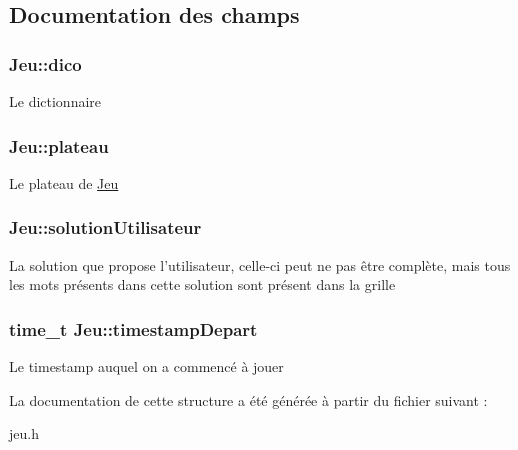 \subsection{Documentation des champs}
\hypertarget{structJeu_a6bda384c6fca4e83ae15ac69f2228a41}{
\subsubsection[{dico}]{ {\bf Jeu::dico}}}
\label{structJeu_a6bda384c6fca4e83ae15ac69f2228a41}
Le dictionnaire \hypertarget{structJeu_af2931c71f6de940ec7ed3fcd2f9d7158}{
\subsubsection[{plateau}]{ {\bf Jeu::plateau}}}
\label{structJeu_af2931c71f6de940ec7ed3fcd2f9d7158}
Le plateau de \hyperlink{structJeu}{Jeu} \hypertarget{structJeu_ae8e1dca71285915404d1de4ff609a1d6}{
\subsubsection[{solutionUtilisateur}]{ {\bf Jeu::solutionUtilisateur}}}
\label{structJeu_ae8e1dca71285915404d1de4ff609a1d6}
La solution que propose l'utilisateur, celle-\/ci peut ne pas être complète, mais tous les mots présents dans cette solution sont présent dans la grille \hypertarget{structJeu_af48a5fddf1dc40b7c4a85918d73f201d}{
\subsubsection[{timestampDepart}]{\setlength{\rightskip}{0pt plus 5cm}time\_\-t {\bf Jeu::timestampDepart}}}
\label{structJeu_af48a5fddf1dc40b7c4a85918d73f201d}
Le timestamp auquel on a commencé à jouer 

La documentation de cette structure a été générée à partir du fichier suivant :\begin{DoxyCompactItemize}
\item 
jeu.h\end{DoxyCompactItemize}
